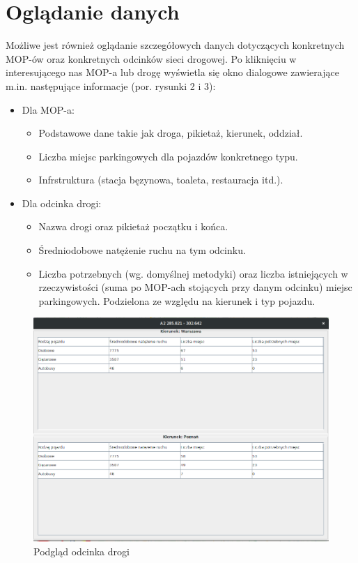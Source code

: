 \documentclass[10pt,paper=a4 BCOR0, DIV15]{scrbook} %
\begin{document}
        \section{Oglądanie danych}
      Możliwe jest również oglądanie szczegółowych danych dotyczących
      konkretnych MOP-ów oraz konkretnych odcinków sieci drogowej. Po
      kliknięciu w interesującego nas MOP-a lub drogę wyświetla się okno
      dialogowe zawierające m.in. następujące informacje (por. rysunki 2 i 3):
      \begin{itemize}
        \item Dla MOP-a:
          \begin{itemize}
            \item Podstawowe dane takie jak droga, pikietaż, kierunek, oddział.
            \item Liczba miejsc parkingowych dla pojazdów konkretnego typu.
            \item Infrstruktura (stacja bęzynowa, toaleta, restauracja itd.).
          \end{itemize}
        \item Dla odcinka drogi:
          \begin{itemize}
            \item Nazwa drogi oraz pikietaż początku i końca.
            \item Średniodobowe natężenie ruchu na tym odcinku.
            \item Liczba potrzebnych (wg. domyślnej metodyki) oraz liczba
              istniejących w rzeczywistości (suma po MOP-ach stojących przy
              danym odcinku) miejsc parkingowych. Podzielona ze względu na
              kierunek i typ pojazdu.
          \end{itemize}
      \end{itemize}
      \begin{figure}[ht]
        \centering
       \includegraphics[width=.8\textwidth]{podglad_drogi.png}
        \caption{Podgląd odcinka drogi}
      \end{figure}
\end{document}
